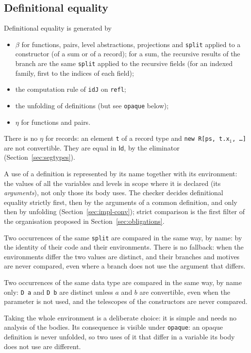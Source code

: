 \documentclass[11pt]{article}
\newcommand{\kw}[1]{\texttt{#1}}
\newcommand{\Id}{\mathsf{Id}}
\theoremstyle{remark}
\begin{document}
\subsection{Definitional equality}\label{sec:conv}

Definitional equality is generated by
\begin{itemize}
\item $\beta$ for functions, pairs, level abstractions, projections and
  \kw{split} applied to a constructor (of a sum or of a record); for a
  sum, the recursive results of the branch are the same \kw{split}
  applied to the recursive fields (for an indexed family, first to the
  indices of each field);
\item the computation rule of \kw{idJ} on \kw{refl};
\item the unfolding of definitions (but see \kw{opaque} below);
\item $\eta$ for functions and pairs.
\end{itemize}
There is no $\eta$ for records: an element \kw{t} of a record type and
\kw{new R[ps, t.x$_1$, \dots]} are not convertible. They are equal in
$\Id$, by the eliminator (Section~\ref{sec:segtypes}).

A use of a definition is represented by its name together with its
environment: the values of all the variables and levels in scope where
it is declared (its \emph{arguments}), not only those its body uses.
The checker decides definitional equality strictly first, then by the
arguments of a common definition, and only then by unfolding
(Section~\ref{sec:impl-conv}); strict comparison is the first filter of
the organisation proposed in Section~\ref{sec:obligations}.

Two occurrences of the same \kw{split} are compared in the same way, by
name: by the identity of their code and their environments. There is no
fallback: when the environments differ the two values are distinct, and
their branches and motives are never compared, even where a branch does
not use the argument that differs.

Two occurrences of the same data type are compared in the same way, by
name only: \kw{D a} and \kw{D b} are distinct unless $a$ and $b$ are
convertible, even when the parameter is not used, and the telescopes of
the constructors are never compared.

Taking the whole environment is a deliberate choice: it is simple and
needs no analysis of the bodies. Its consequence is visible under
\kw{opaque}: an opaque definition is never unfolded, so two uses of it
that differ in a variable its body does not use are different.
\end{document}
